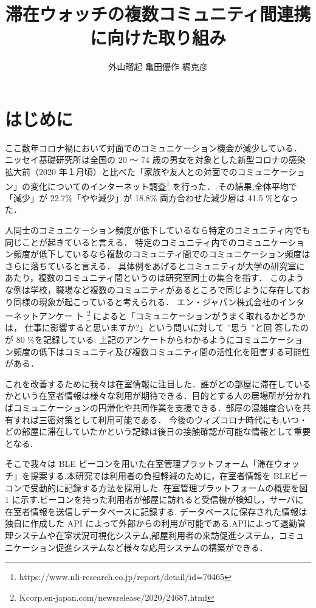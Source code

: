 \documentclass[a4j,8pt,twocolumn]{extarticle}
\title{滞在ウォッチの複数コミュニティ間連携に向けた取り組み}
\author{外山瑠起 \qquad 亀田優作 \qquad 梶克彦}
\affiliation{愛知工業大学 情報科学部}
\begin{document}
\maketitle
\thispagestyle{empty}	%

\section{はじめに}
ここ数年コロナ禍において対面でのコミュニケーション機会が減少している．
ニッセイ基礎研究所は全国の 20 ～ 74 歳の男女を対象とした新型コロナの感染拡大前（2020 年１月頃）と比べた「家族や友人との対面でのコミュニケーション」の変化についてのインターネット調査\footnote[1]{https://www.nli-research.co.jp/report/detail/id=70465} を行った．
その結果,全体平均で「減少」が 22.7\%「やや減少」が 18.8\% 両方合わせた減少層は 41.5 \%となった．

人同士のコミュニケーション頻度が低下しているなら特定のコミュニティ内でも同じことが起きていると言える．
特定のコミュニティ内でのコミュニケーション頻度が低下しているなら複数のコミュニティ間でのコミュニケーション頻度はさらに落ちていると言える．
具体例をあげるとコミュニティが大学の研究室にあたり，複数のコミュニティ間というのは研究室同士の集合を指す．
このような例は学校，職場など複数のコミュニティがあるところで同じように存在しており同様の現象が起こっていると考えられる．
エン・ジャパン株式会社のインターネットアンケー ト \footnote[2]{Kcorp.en-japan.com/newsrelease/2020/24687.html} によると「コミュニケーションがうまく取れるかどうかは， 仕事に影響すると思いますか?」という問いに対して ”思う ”と回 答したのが 80 \%を記録している.
上記のアンケートからわかるようにコミュニケーション頻度の低下はコミュニティ及び複数コミュニティ間の活性化を阻害する可能性がある．


これを改善するために我々は在室情報に注目した．誰がどの部屋に滞在しているかという在室者情報は様々な利用が期待できる．目的とする人の居場所が分かればコミュニケーションの円滑化や共同作業を支援できる．部屋の混雑度合いを共有すれば三密対策として利用可能である． 今後のウィズコロナ時代にも,いつ・どの部屋に滞在していたかという記録は後日の接触確認が可能な情報として重要となる.

そこで我々は BLE ビーコンを用いた在室管理プラットフォーム「滞在ウォッチ」を提案する.本研究では利用者の負担軽減のために，在室者情報を BLEビーコンで受動的に記録する方法を採用した.
在室管理プラットフォームの概要を図 1 に示す.ビーコンを持った利用者が部屋に訪れると受信機が検知し，サーバに在室者情報を送信しデータベースに記録する.
データベースに保存された情報は独自に作成した API によって外部からの利用が可能である.APIによって退勤管理システムや在室状況可視化システム,部屋利用者の来訪促進システム，コミュニケーション促進システムなど様々な応用システムの構築ができる．
\end{document}
